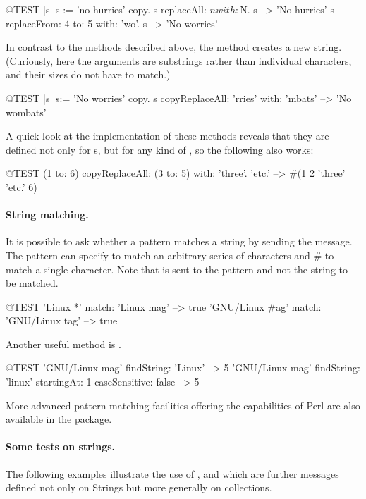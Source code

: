 \documentclass[a4paper,10pt,twoside]{book}
\begin{document}
\begin{code}{@TEST |s| s := 'no hurries' copy.}
s replaceAll: $n with: $N.
s --> 'No hurries'
s replaceFrom: 4 to: 5 with: 'wo'.
s --> 'No worries'
\end{code}

In contrast to the methods described above, the method  creates a new string.
(Curiously, here the arguments are substrings rather than individual characters, and their sizes do not have to match.)

\begin{code}{@TEST |s| s:= 'No worries' copy.}
s copyReplaceAll: 'rries' with: 'mbats' --> 'No wombats'
\end{code}

A quick look at the implementation of these methods reveals that they are defined not only for s, but for any kind of , so the following also works:

\begin{code}{@TEST}
(1 to: 6) copyReplaceAll: (3 to: 5) with: { 'three'. 'etc.' } --> #(1 2 'three' 'etc.' 6)
\end{code}

\paragraph{String matching.}
It is possible to ask whether a pattern matches a string by sending the  message.
The pattern can specify \ct{*} to match an arbitrary series of characters and \# to match a single character. Note that  is sent to the pattern and not the string to be matched.
\begin{code}{@TEST}
'Linux *' match: 'Linux mag'                      --> true
'GNU/Linux #ag' match: 'GNU/Linux tag' --> true
\end{code}

Another useful method is .
\begin{code}{@TEST}
'GNU/Linux mag' findString: 'Linux'                                                      --> 5
'GNU/Linux mag' findString: 'linux' startingAt: 1 caseSensitive: false  --> 5
\end{code}

More advanced pattern matching facilities offering the capabilities of Perl are also available in the  package.

\paragraph{Some tests on strings.} The  following examples illustrate the use of \mbox{,}  and  which are further messages defined not only on Strings but more generally on collections. 
\end{document}
